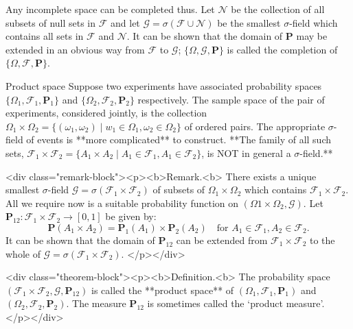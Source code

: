 Any incomplete space can be completed thus. Let $\mathcal{N}$ be the collection of all subsets of null sets in $\mathcal{F}$ and let $\mathcal{G} = \sigma (\mathcal{F} \cup \mathcal{N})$ be the smallest $\sigma$-field which contains all sets in $\mathcal{F}$ 
and $\mathcal{N}$. It can be shown that the domain of $\mathbf{P}$ may be extended in an obvious way from $\mathcal{F}$ to $\mathcal{G}$; $\{\Omega, \mathcal{G}, \mathbf{P}\}$ is called the completion of $\{\Omega, \mathcal{F}, \mathbf{P}\}$. 

\begin{newnotion}{Product space}
Suppose two experiments have associated probability spaces $\{ \Omega_1, \mathcal{F}_1, \mathbf{P}_1 \}$ and  $\{ \Omega_2, \mathcal{F}_2, \mathbf{P}_2 \}$ respectively. The sample space of the pair of experiments, considered jointly, is the collection $\Omega_1 \times \Omega_2 = \{ (\omega_1 , \omega_2) \;\vert\; w_1 \in \Omega_1, \omega_2 \in \Omega_2 \}$ of ordered pairs. The appropriate $\sigma$-field of events is **more complicated** to construct. **The family of all such sets, $\mathcal{F}_1 \times \mathcal{F}_2 = \{A_1 \times A_2 \;\vert\; A_1 \in \mathcal{F}_1 , A_1 \in \mathcal{F}_2 \}$, is NOT in general a $\sigma$-field.**
\end{newnotion}

<div class="remark-block"><p><b>Remark.<b> 
There exists a unique smallest $\sigma$-field $\mathcal{G} = \sigma(\mathcal{F}_1 \times \mathcal{F}_2)$ of subsets of $\Omega_1 \times \Omega_2$ which contains $\mathcal{F}_1 \times \mathcal{F}_2$. All we require now is a suitable probability function on $( \Omega1 \times \Omega_2, \mathcal{G} )$. Let $\mathbf{P}_{12}: \mathcal{F}_1 \times \mathcal{F}_2 \to [0, 1]$ be given by: 
$$\begin{equation}
    \mathbf{P}(A_1 \times A_2) = \mathbf{P}_1(A_1) \times \mathbf{P}_2(A_2) \quad \text{for $A_1 \in \mathcal{F}_1, A_2 \in \mathcal{F}_2$}.
\end{equation}$$
It can be shown that the domain of $\mathbf{P}_{12}$ can be extended from $\mathcal{F}_1 \times \mathcal{F}_2$ to the whole of $\mathcal{G} = \sigma(\mathcal{F}_1 \times \mathcal{F}_2)$.
</p></div>

<div class="theorem-block"><p><b>Definition.<b> 
The probability space $(\mathcal{F}_1 \times \mathcal{F}_2, \mathcal{G}, \mathbf{P}_{12})$ is called the **product space** of $(\Omega_1, \mathcal{F}_1, \mathbf{P}_1)$ and  $(\Omega_2, \mathcal{F}_2, \mathbf{P}_2)$. The measure $\mathbf{P}_{12}$ is sometimes called the `product measure'. 
</p></div>



